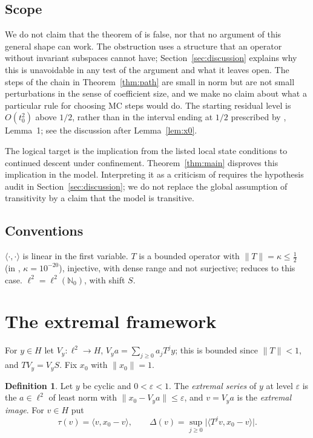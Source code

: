 \documentclass[11pt]{article}
\theoremstyle{definition}
\newtheorem{definition}[theorem]{Definition}
\newcommand{\N}{\mathbb{N}}
\newcommand{\ip}[2]{\langle #1,#2\rangle}
\newcommand{\norm}[1]{\lVert #1\rVert}
\newcommand{\abs}[1]{\lvert #1\rvert}
\begin{document}
\subsection*{Scope}
We do not claim that the theorem of \cite{E} is false, nor that no argument of this general
shape can work. The obstruction uses a structure that an operator without invariant subspaces
cannot have; Section~\ref{sec:discussion} explains why this is unavoidable in any test of the
argument and what it leaves open. The steps of the chain in Theorem~\ref{thm:path} are small in
norm but are not small perturbations in the sense of coefficient size, and we make no claim
about what a particular rule for choosing MC steps would do. The starting residual level is
$O(t_0^2)$ above $1/2$, rather than in the interval ending at $1/2$ prescribed by
\cite{E}, Lemma~1; see the discussion after Lemma~\ref{lem:x0}.

The logical target is the implication from the listed local state conditions to continued
descent under confinement. Theorem~\ref{thm:main} disproves this implication in the model.
Interpreting it as a criticism of \cite{E} requires the hypothesis audit in
Section~\ref{sec:discussion}; we do not replace the global assumption of transitivity by
a claim that the model is transitive.

\subsection*{Conventions}
$\ip\cdot\cdot$ is linear in the first variable. $T$ is a bounded operator with
$\norm T=\kappa\le\frac12$ (in \cite{E}, $\kappa=10^{-20}$), injective, with dense range and not
surjective; \cite{E} reduces to this case. $\ell^2=\ell^2(\N_0)$, with shift $S$.

\section{The extremal framework}

For $y\in H$ let $V_y:\ell^2\to H$, $V_ya=\sum_{j\ge0}a_jT^jy$; this is bounded since
$\norm T<1$, and $TV_y=V_yS$. Fix $x_0$ with $\norm{x_0}=1$.

\begin{definition}
Let $y$ be cyclic and $0<\varepsilon<1$. The \emph{extremal series} of $y$ at level
$\varepsilon$ is the $a\in\ell^2$ of least norm with $\norm{x_0-V_ya}\le\varepsilon$, and
$v=V_ya$ is the \emph{extremal image}. For $v\in H$ put
\[
\tau(v)=\ip{v}{x_0-v},\qquad\Delta(v)=\sup_{j\ge0}\abs{\ip{T^jv}{x_0-v}} .
\]
\end{definition}
\end{document}
